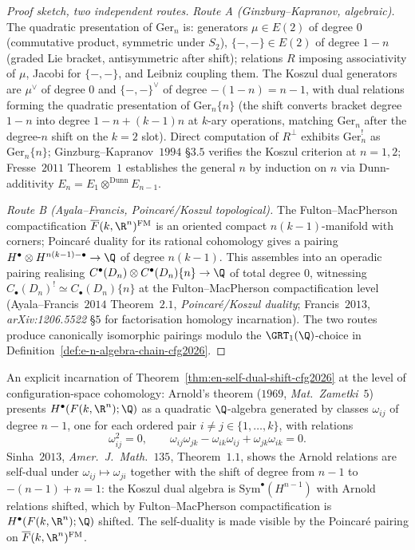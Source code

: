 \begin{proof}[Proof sketch, two independent routes]
\emph{Route A (Ginzburg--Kapranov, algebraic).} The quadratic
presentation of $\mathrm{Ger}_n$ is: generators $\mu \in E(2)$ of degree
$0$ (commutative product, symmetric under $S_2$), $\{-,-\} \in E(2)$ of
degree $1 - n$ (graded Lie bracket, antisymmetric after shift);
relations $R$ imposing associativity of $\mu$, Jacobi for $\{-,-\}$,
and Leibniz coupling them. The Koszul dual generators are
$\mu^\vee$ of degree $0$ and $\{-,-\}^\vee$ of degree $-(1 - n) = n - 1$,
with dual relations forming the quadratic presentation of
$\mathrm{Ger}_n\{n\}$ (the shift converts bracket degree
$1 - n$ into degree $1 - n + (k-1) n$ at $k$-ary operations, matching
$\mathrm{Ger}_n$ after the degree-$n$ shift on the $k = 2$ slot).
Direct computation of $R^\perp$ exhibits $\mathrm{Ger}_n^{!}$ as
$\mathrm{Ger}_n\{n\}$; Ginzburg--Kapranov~$1994$ \S$3.5$ verifies the
Koszul criterion at $n = 1, 2$; Fresse~$2011$ Theorem~$1$ establishes
the general $n$ by induction on $n$ via Dunn-additivity
$E_n = E_1 \otimes^{\mathrm{Dunn}} E_{n-1}$.

\emph{Route B (Ayala--Francis, Poincar\'e/Koszul topological).}
The Fulton--MacPherson compactification $\overline{F}(k, \R^n)^{\mathrm{FM}}$
is an oriented compact $n(k-1)$-manifold with corners; Poincar\'e duality
for its rational cohomology gives a pairing
$H^\bullet \otimes H^{n(k-1) - \bullet} \to \Q$ of degree $n(k - 1)$.
This assembles into an operadic pairing realising
$C^\bullet(D_n) \otimes C^\bullet(D_n)\{n\} \to \Q$ of total degree $0$,
witnessing $C_\bullet(D_n)^{!} \simeq C_\bullet(D_n)\{n\}$ at the
Fulton--MacPherson compactification level
(Ayala--Francis~$2014$ Theorem~$2.1$, \emph{Poincar\'e/Koszul duality};
Francis~$2013$, \textit{arXiv:1206.5522} \S$5$ for factorisation homology
incarnation). The two routes produce canonically isomorphic pairings
modulo the $\GRT_1(\Q)$-choice in Definition~\ref{def:e-n-algebra-chain-cfg2026}.
\end{proof}

\begin{remark}
\label{rem:arnold-relations-self-dual-cfg2026}
An explicit incarnation of Theorem~\textup{\ref{thm:en-self-dual-shift-cfg2026}}
at the level of configuration-space cohomology: Arnold's theorem
($1969$, \textit{Mat.~Zametki}~$5$) presents
$H^\bullet(F(k, \R^n); \Q)$ as a quadratic $\Q$-algebra generated by
classes $\omega_{ij}$ of degree $n - 1$, one for each ordered pair
$i \neq j \in \{1, \ldots, k\}$, with relations
\[
 \omega_{ij}^2 = 0, \qquad
 \omega_{ij} \omega_{jk} - \omega_{ik} \omega_{ij} + \omega_{jk} \omega_{ik} = 0.
\]
Sinha~$2013$, \textit{Amer.~J.~Math.}~$135$, Theorem~$1.1$, shows the
Arnold relations are self-dual under $\omega_{ij} \mapsto \omega_{ji}$
together with the shift of degree from $n - 1$ to $-(n-1) + n = 1$:
the Koszul dual algebra is $\mathrm{Sym}^\bullet(H^{n-1})$ with
Arnold relations shifted, which by Fulton--MacPherson compactification
is $H^\bullet(F(k, \R^n); \Q)$ shifted. The self-duality is made
visible by the Poincar\'e pairing on $\overline{F}(k, \R^n)^{\mathrm{FM}}$.
\end{remark}

